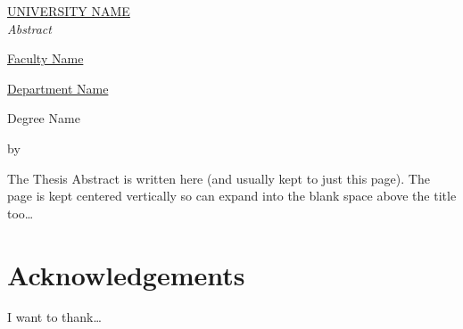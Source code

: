 \cleardoublepage
\thispagestyle{empty}
\null
\vfill
\begin{center}
  \makeatletter
  \MakeUppercase{\href{https://href.com}{University Name}} \\
  \bigskip
  \huge{\textit{Abstract}} \\
  \bigskip
  {\normalsize \href{https://href.com}{Faculty Name} \par}
  {\normalsize \href{https://href.com}{Department Name} \par}
  \bigskip
  {\normalsize Degree Name \par}
  \bigskip
  {\normalsize\bfseries \@title \par}
  \medskip
  {\normalsize by \@author \par}
  \bigskip
  \makeatother
\end{center}
\small{The Thesis Abstract is written here (and usually kept to just this
  page). The page is kept centered vertically so can expand into the blank space
  above the title too\ldots}
\vfill
\null


\chapter*{Acknowledgements}
I want to thank\ldots


\tableofcontents
\listoftables
\listoffigures
\clearpage
